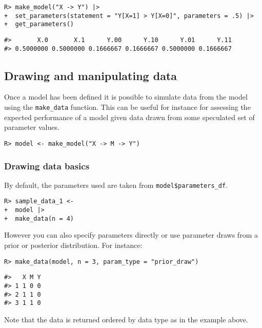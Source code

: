 \documentclass[
  11pt,
  article]{jss}
\begin{document}
\begin{verbatim}
R> make_model("X -> Y") |>
+  set_parameters(statement = "Y[X=1] > Y[X=0]", parameters = .5) |>
+  get_parameters()
\end{verbatim}

\begin{verbatim}
#>       X.0       X.1      Y.00      Y.10      Y.01      Y.11 
#> 0.5000000 0.5000000 0.1666667 0.1666667 0.5000000 0.1666667
\end{verbatim}

\hypertarget{drawing-and-manipulating-data}{%
\subsection{Drawing and manipulating
data}\label{drawing-and-manipulating-data}}

Once a model has been defined it is possible to simulate data from the
model using the \texttt{make\_data} function. This can be useful for
instance for assessing the expected performance of a model given data
drawn from some speculated set of parameter values.

\begin{verbatim}
R> model <- make_model("X -> M -> Y") 
\end{verbatim}

\hypertarget{drawing-data-basics}{%
\subsubsection{Drawing data basics}\label{drawing-data-basics}}

By default, the parameters used are taken from
\texttt{model\$parameters\_df}.

\begin{verbatim}
R> sample_data_1 <- 
+  model |> 
+  make_data(n = 4)
\end{verbatim}

However you can also specify parameters directly or use parameter draws
from a prior or posterior distribution. For instance:

\begin{verbatim}
R> make_data(model, n = 3, param_type = "prior_draw")
\end{verbatim}

\begin{verbatim}
#>   X M Y
#> 1 1 0 0
#> 2 1 1 0
#> 3 1 1 0
\end{verbatim}

Note that the data is returned ordered by data type as in the example
above.
\end{document}

